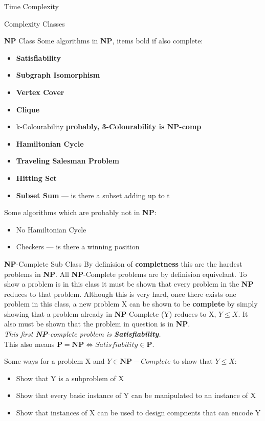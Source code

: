 \documentclass[12pt, letterpaper]{article}
\begin{document}
\begin{section}{Time Complexity}
\begin{subsection}{Complexity Classes}
\begin{subsubsection}{\textbf{NP} Class}
      Some algorithms in \textbf{NP}, items bold if also complete:
      \begin{itemize}
        \item \textbf{Satisfiability}
        \item \textbf{Subgraph Isomorphism}
        \item \textbf{Vertex Cover}
        \item \textbf{Clique}
        \item k-Colourability \textbf{probably, 3-Colourability is NP-comp}
        \item \textbf{Hamiltonian Cycle}
        \item \textbf{Traveling Salesman Problem}
        \item \textbf{Hitting Set}
        \item \textbf{Subset Sum} --- is there a subset adding up to t
      \end{itemize}

      Some algorithms which are probably not in \textbf{NP}:
      \begin{itemize}
        \item No Hamiltonian Cycle
        \item Checkers --- is there a winning position
      \end{itemize}
    \end{subsubsection}

    \begin{subsubsection}{\textbf{NP}-Complete Sub Class}
      By definision of \textbf{completness} this are the hardest problems in \textbf{NP}.
      All \textbf{NP}-Complete problems are by definision equivelant.
      To show a problem is in this class it must be shown that every problem in
      the \textbf{NP} reduces to that problem. Although this is very hard, once there
      exists one problem in this class, a new problem X can be shown to be \textbf{complete}
      by simply showing that a problem already in \textbf{NP}-Complete (Y) reduces to X,
      \(Y \leq X\).
      It also must be shown that the problem in question is in \textbf{NP}. \\
      \emph{This first \textbf{NP}-complete problem is \textbf{Satisfiability}.} \\
      This also means \(\textbf{P} = \textbf{NP} \iff Satisfiability \in \textbf{P}\).

      Some ways for a problem X and \(Y \in \textbf{NP}-Complete\) to show that
      \(Y \leq X\):
      \begin{itemize}
        \item Show that Y is a subproblem of X
        \item Show that every basic instance of Y can be manipulated to an instance of X
        \item Show that instances of X can be used to design compnents that can encode Y
      \end{itemize}


\end{subsubsection}
\end{subsection}
\end{section}
\end{document}
